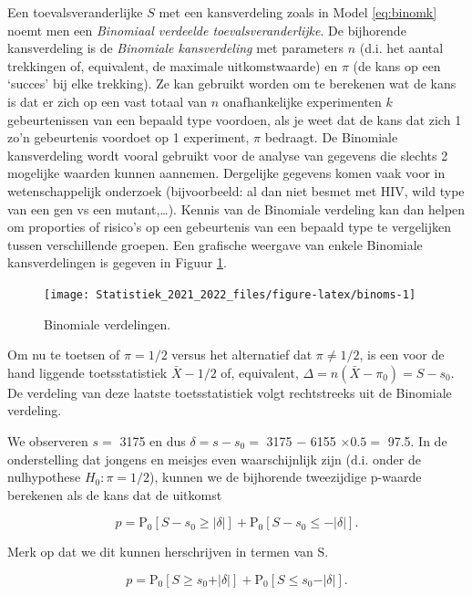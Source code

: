 \documentclass[
  12pt,dutch,coursenotes]{book}
\theoremstyle{definition}
\theoremstyle{definition}
\theoremstyle{definition}
\theoremstyle{definition}
\theoremstyle{remark}
\begin{document}
Een toevalsveranderlijke \(S\) met een kansverdeling zoals in Model \eqref{eq:binomk} noemt men een \emph{Binomiaal verdeelde toevalsveranderlijke}. De bijhorende kansverdeling is de \emph{Binomiale kansverdeling} met
parameters \(n\) (d.i. het aantal trekkingen of, equivalent, de maximale
uitkomstwaarde) en \(\pi\) (de kans op een `succes' bij elke trekking). Ze
kan gebruikt worden om te berekenen wat de kans is dat er zich op een vast
totaal van \(n\) onafhankelijke experimenten \(k\) gebeurtenissen van een
bepaald type voordoen, als je weet dat de kans dat zich 1 zo'n gebeurtenis
voordoet op 1 experiment, \(\pi\) bedraagt. De Binomiale kansverdeling wordt
vooral gebruikt voor de analyse van gegevens die slechts 2
mogelijke waarden kunnen aannemen.
Dergelijke gegevens komen vaak voor in wetenschappelijk onderzoek (bijvoorbeeld: al dan niet besmet met HIV, wild type van een gen vs een mutant,\ldots).
Kennis van de Binomiale verdeling kan dan helpen om proporties of risico's
op een gebeurtenis van een bepaald type te vergelijken tussen verschillende
groepen. Een grafische weergave van enkele Binomiale kansverdelingen is
gegeven in Figuur \ref{fig:binoms}.

\begin{figure}

{\centering \texttt{[image: Statistiek\_2021\_2022\_files/figure-latex/binoms-1]} 

}

\caption{Binomiale verdelingen.}\label{fig:binoms}
\end{figure}

Om nu te toetsen of \(\pi=1/2\) versus het alternatief dat \(\pi\neq 1/2\), is een
voor de hand liggende toetsstatistiek \(\bar X-1/2\) of, equivalent, \(\Delta=n(\bar X-\pi_0)=S-s_0\). De verdeling van deze laatste toetsstatistiek volgt
rechtstreeks uit de Binomiale verdeling.

We observeren \(s=\) 3175 en dus \(\delta=s-s_0=\) 3175 \(-\) 6155 \(\times 0.5=\) 97.5.
In de onderstelling dat jongens en meisjes even waarschijnlijk zijn (d.i. onder de nulhypothese \(H_0:\pi=1/2\)), kunnen we de bijhorende tweezijdige p-waarde berekenen als de kans dat de uitkomst

\[p=\text{P}_0\left[S-s_0\geq \vert \delta\vert \right] + \text{P}_0\left[S-s_0\leq - \vert \delta\vert \right].\]

Merk op dat we dit kunnen herschrijven in termen van S.

\[p=\text{P}_0\left[S\geq s_0+ \vert \delta\vert \right] + \text{P}_0\left[S \leq s_0 - \vert \delta\vert \right].\]
\end{document}
